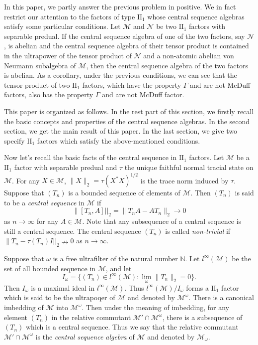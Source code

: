 \documentclass[12pt]{article}
\begin{document}
In this paper, we partly answer the previous problem in positive. We
in fact restrict our attention to the factors of type
$\mathrm{II}_{1}$ whose central sequence algebras satisfy some
particular conditions. Let $\mathcal{M}$ and $\mathcal{N}$ be two
$\mathrm{II}_{1}$ factors with separable predual. If the central
sequence algebra of one of the two factors, say $\mathcal{N}$, is
abelian and the central sequence algebra of their tensor product is
contained in the ultrapower of the tensor product of $\mathcal{N}$
and a non-atomic abelian von Neumann subalgebra of $\mathcal{M}$,
then the central sequence algebra of the two factors is abelian. As
a corollary, under the previous conditions, we can see that the
tensor product of two $\mathrm{II}_{1}$ factors, which have the
property $\Gamma$ and are not McDuff factors, also has the property
$\Gamma$ and are not McDuff factor.



This paper is organized as follows. In the rest part of this
section, we firstly recall the basic concepts and properties of the
central sequence algebras. In the second section, we get the main
result of this paper. In the last section, we give two specify
$\mathrm{II}_{1}$ factors which satisfy the above-mentioned
conditions.

Now let's recall the basic facts of the central sequence in
$\mathrm{II}_{1}$ factors. Let $\mathcal{M}$ be a $\mathrm{II}_{1}$
factor with separable predual and $\tau$ the unique faithful normal
tracial state on $\mathcal{M}$. For any $X\in\mathcal{M}$,
$\|X\|_{2}=\tau(X^{*}X)^{1/2}$ is the trace norm induced by $\tau$.
Suppose that $(T_{n})$ is a bounded sequence of elements of
$\mathcal{M}$. Then $(T_{n})$ is said to be a {\it central sequence}
in $\mathcal{M}$ if
$$\|[T_{n},A]||_{2}=\|T_{n}A-AT_{n}\|_{2}\rightarrow0$$
as $n\rightarrow\infty$ for any $A\in\mathcal{M}$. Note that any
subsequence of a central sequence is still a central sequence. The
central sequence $(T_{n})$ is called {\it non-trivial} if
$\|T_{n}-\tau(T_{n})I||_{2}\nrightarrow0$ as $n\rightarrow\infty$.

Suppose that $\omega$ is a free ultrafilter of the natural number
$\mathbb{N}$. Let $l^{\infty}(\mathcal{M})$ be the set of all
bounded sequence in $\mathcal{M}$, and let
$$I_{\omega}=\{(T_{n})\in l^{\infty}(\mathcal{M}):\lim_{\omega}\|T_{n}\|_{2}=0\}.$$
Then $I_{\omega}$ is a maximal ideal in $l^{\infty}(\mathcal{M})$.
Thus $l^{\infty}(\mathcal{M})/I_{\omega}$ forms a $\mathrm{II}_{1}$
factor {\cite{[Sa]}} which is said to be the ultrapoqer of
$\mathcal{M}$ and denoted by $\mathcal{M}^{\omega}$. There is a
canonical imbedding of $\mathcal{M}$ into $\mathcal{M}^{\omega}$.
Then under the meaning of imbedding, for any element $(T_{n})$ in
the relative commutant $\mathcal{M}'\cap\mathcal{M}^{\omega}$, there
is a subsequence of $(T_{n})$ which is a central sequence. Thus we
say that the relative commutant
$\mathcal{M}'\cap\mathcal{M}^{\omega}$ is the {\it central sequence
algebra} of $\mathcal{M}$ and denoted by $\mathcal{M}_{\omega}$.
\end{document}
